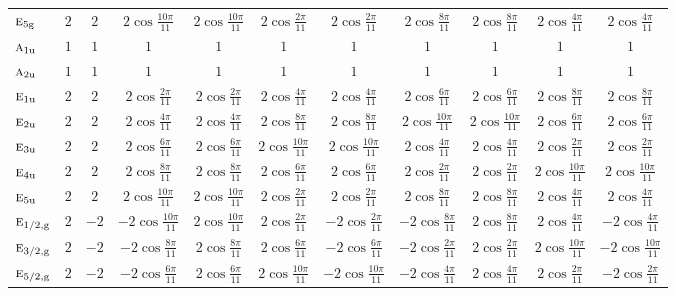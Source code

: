 \documentclass[10pt,a4paper]{article}
\makeatletter
\def\grouprule#1#2{\noalign{\marks\LTgroupmarks{\the\belowrulesep}\nobreak\vskip#1%
  \vskip\aboverulesep}\multispan\LT@cols\unskip{\leaders\hrule\@height#2\hfill\kern\z@}\cr
  \noalign{\penalty\LTrulebreak\vskip\belowrulesep\global\@lastruleclass\z@}}
\numberwithin{equation}{section}
\newcommand{\irr}[1]{\text{\normalfont\scshape #1}}
\newcommand{\ptag}[1]{\mathrm{#1}}
\makeatother
\begin{document}
{{\begin{longtable}{@{}lcccccccccc@{}}
$\irr{e}_{5\ptag{g}}$ & $2$ & $2$ & $2\cos\tfrac{10\pi}{11}$ & $2\cos\tfrac{10\pi}{11}$ & $2\cos\tfrac{2\pi}{11}$ & $2\cos\tfrac{2\pi}{11}$ & $2\cos\tfrac{8\pi}{11}$ & $2\cos\tfrac{8\pi}{11}$ & $2\cos\tfrac{4\pi}{11}$ & $2\cos\tfrac{4\pi}{11}$\\
$\irr{a}_{1\ptag{u}}$ & $1$ & $1$ & $1$ & $1$ & $1$ & $1$ & $1$ & $1$ & $1$ & $1$\\
$\irr{a}_{2\ptag{u}}$ & $1$ & $1$ & $1$ & $1$ & $1$ & $1$ & $1$ & $1$ & $1$ & $1$\\
$\irr{e}_{1\ptag{u}}$ & $2$ & $2$ & $2\cos\tfrac{2\pi}{11}$ & $2\cos\tfrac{2\pi}{11}$ & $2\cos\tfrac{4\pi}{11}$ & $2\cos\tfrac{4\pi}{11}$ & $2\cos\tfrac{6\pi}{11}$ & $2\cos\tfrac{6\pi}{11}$ & $2\cos\tfrac{8\pi}{11}$ & $2\cos\tfrac{8\pi}{11}$\\
$\irr{e}_{2\ptag{u}}$ & $2$ & $2$ & $2\cos\tfrac{4\pi}{11}$ & $2\cos\tfrac{4\pi}{11}$ & $2\cos\tfrac{8\pi}{11}$ & $2\cos\tfrac{8\pi}{11}$ & $2\cos\tfrac{10\pi}{11}$ & $2\cos\tfrac{10\pi}{11}$ & $2\cos\tfrac{6\pi}{11}$ & $2\cos\tfrac{6\pi}{11}$\\
$\irr{e}_{3\ptag{u}}$ & $2$ & $2$ & $2\cos\tfrac{6\pi}{11}$ & $2\cos\tfrac{6\pi}{11}$ & $2\cos\tfrac{10\pi}{11}$ & $2\cos\tfrac{10\pi}{11}$ & $2\cos\tfrac{4\pi}{11}$ & $2\cos\tfrac{4\pi}{11}$ & $2\cos\tfrac{2\pi}{11}$ & $2\cos\tfrac{2\pi}{11}$\\
$\irr{e}_{4\ptag{u}}$ & $2$ & $2$ & $2\cos\tfrac{8\pi}{11}$ & $2\cos\tfrac{8\pi}{11}$ & $2\cos\tfrac{6\pi}{11}$ & $2\cos\tfrac{6\pi}{11}$ & $2\cos\tfrac{2\pi}{11}$ & $2\cos\tfrac{2\pi}{11}$ & $2\cos\tfrac{10\pi}{11}$ & $2\cos\tfrac{10\pi}{11}$\\
$\irr{e}_{5\ptag{u}}$ & $2$ & $2$ & $2\cos\tfrac{10\pi}{11}$ & $2\cos\tfrac{10\pi}{11}$ & $2\cos\tfrac{2\pi}{11}$ & $2\cos\tfrac{2\pi}{11}$ & $2\cos\tfrac{8\pi}{11}$ & $2\cos\tfrac{8\pi}{11}$ & $2\cos\tfrac{4\pi}{11}$ & $2\cos\tfrac{4\pi}{11}$\\
\grouprule{0pt}{\lightrulewidth}
$\irr{e}_{1/2,\ptag{g}}$ & $2$ & $-2$ & $-2\cos\tfrac{10\pi}{11}$ & $2\cos\tfrac{10\pi}{11}$ & $2\cos\tfrac{2\pi}{11}$ & $-2\cos\tfrac{2\pi}{11}$ & $-2\cos\tfrac{8\pi}{11}$ & $2\cos\tfrac{8\pi}{11}$ & $2\cos\tfrac{4\pi}{11}$ & $-2\cos\tfrac{4\pi}{11}$\\
$\irr{e}_{3/2,\ptag{g}}$ & $2$ & $-2$ & $-2\cos\tfrac{8\pi}{11}$ & $2\cos\tfrac{8\pi}{11}$ & $2\cos\tfrac{6\pi}{11}$ & $-2\cos\tfrac{6\pi}{11}$ & $-2\cos\tfrac{2\pi}{11}$ & $2\cos\tfrac{2\pi}{11}$ & $2\cos\tfrac{10\pi}{11}$ & $-2\cos\tfrac{10\pi}{11}$\\
$\irr{e}_{5/2,\ptag{g}}$ & $2$ & $-2$ & $-2\cos\tfrac{6\pi}{11}$ & $2\cos\tfrac{6\pi}{11}$ & $2\cos\tfrac{10\pi}{11}$ & $-2\cos\tfrac{10\pi}{11}$ & $-2\cos\tfrac{4\pi}{11}$ & $2\cos\tfrac{4\pi}{11}$ & $2\cos\tfrac{2\pi}{11}$ & $-2\cos\tfrac{2\pi}{11}$\\

\end{longtable}}}
\end{document}
